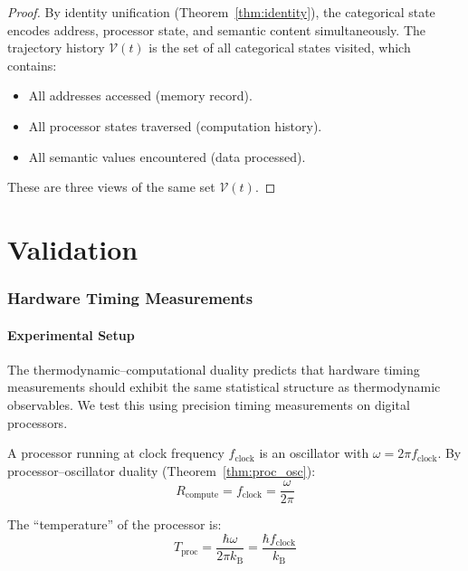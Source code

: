 \documentclass[twocolumn,10pt,a4paper]{article}
\theoremstyle{plain}
\theoremstyle{definition}
\theoremstyle{remark}
\newcommand{\kB}{k_{\mathrm{B}}}
\begin{document}
\begin{proof}
By identity unification (Theorem~\ref{thm:identity}), the categorical state encodes address, processor state, and semantic content simultaneously. The trajectory history $\mathcal{V}(t)$ is the set of all categorical states visited, which contains:
\begin{itemize}
    \item All addresses accessed (memory record).
    \item All processor states traversed (computation history).
    \item All semantic values encountered (data processed).
\end{itemize}
These are three views of the same set $\mathcal{V}(t)$.
\end{proof}


\part{Validation}
\label{part:validation}

\section{Hardware Timing Measurements}
\label{sec:hardware}

\subsection{Experimental Setup}

The thermodynamic--computational duality predicts that hardware timing measurements should exhibit the same statistical structure as thermodynamic observables. We test this using precision timing measurements on digital processors.

A processor running at clock frequency $f_{\mathrm{clock}}$ is an oscillator with $\omega = 2\pi f_{\mathrm{clock}}$. By processor--oscillator duality (Theorem~\ref{thm:proc_osc}):
\begin{equation}
    R_{\mathrm{compute}} = f_{\mathrm{clock}} = \frac{\omega}{2\pi}
\end{equation}

The ``temperature'' of the processor is:
\begin{equation}
    T_{\mathrm{proc}} = \frac{\hbar \omega}{2\pi \kB} = \frac{\hbar f_{\mathrm{clock}}}{\kB}
\end{equation}
\end{document}
